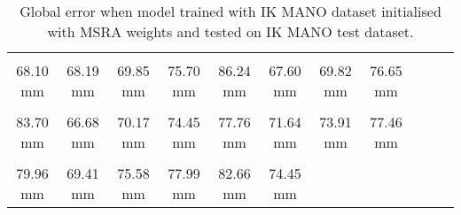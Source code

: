 \begin{table}[!ht]
    \begin{tabular}{|c|c|c|c|c|c|c|c|c|c|c|}
    \hline
    \cellcolor[HTML]{ff8000}{\bfseries Wrist} & \cellcolor[HTML]{ff8000}{\bfseries IMCP} & \cellcolor[HTML]{ff8000}{\bfseries IPIP} & \cellcolor[HTML]{ff7500}{\bfseries IDIP} & \cellcolor[HTML]{ff2500}{\bfseries ITIP} & \cellcolor[HTML]{ff8000}{\bfseries MMCP} & \cellcolor[HTML]{ff8000}{\bfseries MPIP} & \cellcolor[HTML]{ff7500}{\bfseries MDIP}  \\
    \cellcolor[HTML]{ff8000}$\,\,\,$68.10 mm & \cellcolor[HTML]{ff8000}$\,\,\,$68.19 mm & \cellcolor[HTML]{ff8000}$\,\,\,$69.85 mm & \cellcolor[HTML]{ff7500}$\,\,\,$75.70 mm & \cellcolor[HTML]{ff2500}$\,\,\,$86.24 mm & \cellcolor[HTML]{ff8000}$\,\,\,$67.60 mm & \cellcolor[HTML]{ff8000}$\,\,\,$69.82 mm & \cellcolor[HTML]{ff7500}$\,\,\,$76.65 mm\\
    \hline
    \cellcolor[HTML]{ff2500}{\bfseries MTIP} & \cellcolor[HTML]{ff8000}{\bfseries RMCP} & \cellcolor[HTML]{ff7500}{\bfseries RPIP} & \cellcolor[HTML]{ff7500}{\bfseries RDIP} & \cellcolor[HTML]{ff7500}{\bfseries RTIP} & \cellcolor[HTML]{ff7500}{\bfseries PMCP} & \cellcolor[HTML]{ff7500}{\bfseries PPIP} & \cellcolor[HTML]{ff7500}{\bfseries PDIP}  \\
    \cellcolor[HTML]{ff2500}$\,\,\,$83.70 mm & \cellcolor[HTML]{ff8000}$\,\,\,$66.68 mm & \cellcolor[HTML]{ff7500}$\,\,\,$70.17 mm & \cellcolor[HTML]{ff7500}$\,\,\,$74.45 mm & \cellcolor[HTML]{ff7500}$\,\,\,$77.76 mm & \cellcolor[HTML]{ff7500}$\,\,\,$71.64 mm & \cellcolor[HTML]{ff7500}$\,\,\,$73.91 mm & \cellcolor[HTML]{ff7500}$\,\,\,$77.46 mm\\
    \hline
    \cellcolor[HTML]{ff7500}{\bfseries PTIP} & \cellcolor[HTML]{ff8000}{\bfseries TMCP} & \cellcolor[HTML]{ff7500}{\bfseries TPIP} & \cellcolor[HTML]{ff7500}{\bfseries PDIP} & \cellcolor[HTML]{ff2500}{\bfseries TTIP} & \cellcolor[HTML]{ff7500}{\bfseries Average}  \\
    \cellcolor[HTML]{ff7500}$\,\,\,$79.96 mm & \cellcolor[HTML]{ff8000}$\,\,\,$69.41 mm & \cellcolor[HTML]{ff7500}$\,\,\,$75.58 mm & \cellcolor[HTML]{ff7500}$\,\,\,$77.99 mm & \cellcolor[HTML]{ff2500}$\,\,\,$82.66 mm & \cellcolor[HTML]{ff7500}$\,\,\,$74.45 mm \\
    \cline{1-6}
    \end{tabular}
    \caption{Global error when model trained with IK MANO dataset initialised with MSRA weights and tested on IK MANO test dataset.}
    \label{tb:amog}
    \end{table}

